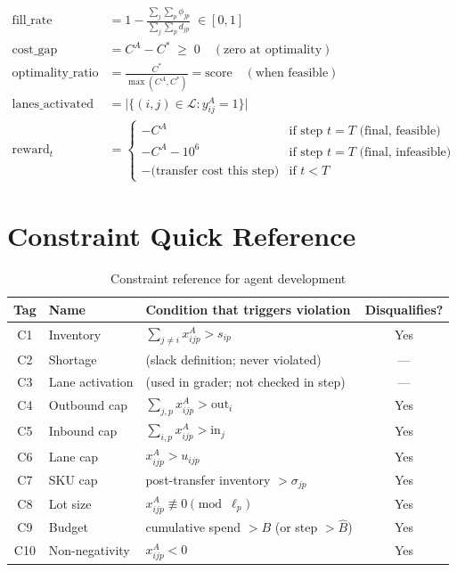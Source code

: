 \documentclass[11pt, a4paper]{article}
\begin{document}
\begin{align}
  \text{fill\_rate}
  &= 1 - \frac{\displaystyle\sum_{j}\sum_{p} \phi_{jp}}
              {\displaystyle\sum_{j}\sum_{p} d_{jp}}
  \;\in [0, 1] \\[6pt]
  \text{cost\_gap}
  &= C^A - C^* \;\geq\; 0
    \quad (\text{zero at optimality}) \\[6pt]
  \text{optimality\_ratio}
  &= \frac{C^*}{\max(C^A, C^*)}
    = \text{score}
    \quad (\text{when feasible}) \\[6pt]
  \text{lanes\_activated}
  &= \bigl|\{(i,j) \in \mathcal{L} : y_{ij}^A = 1\}\bigr| \\[6pt]
  \text{reward}_t
  &=
  \begin{cases}
    -C^A & \text{if step $t = T$ (final, feasible)} \\
    -C^A - 10^6 & \text{if step $t = T$ (final, infeasible)} \\
    -\text{(transfer cost this step)} & \text{if } t < T
  \end{cases}
\end{align}

\appendix
\section{Constraint Quick Reference}

\begin{table}[h!]
\centering
\renewcommand{\arraystretch}{1.4}
\begin{tabular}{@{}clp{7cm}c@{}}
\toprule
\textbf{Tag} & \textbf{Name} & \textbf{Condition that triggers violation}
  & \textbf{Disqualifies?} \\
\midrule
C1  & Inventory      & $\sum_{j\neq i} x_{ijp}^A > s_{ip}$   & Yes \\
C2  & Shortage       & (slack definition; never violated)     & --- \\
C3  & Lane activation & (used in grader; not checked in step) & --- \\
C4  & Outbound cap   & $\sum_{j,p} x_{ijp}^A > \text{out}_i$ & Yes \\
C5  & Inbound cap    & $\sum_{i,p} x_{ijp}^A > \text{in}_j$  & Yes \\
C6  & Lane cap       & $x_{ijp}^A > u_{ijp}$                 & Yes \\
C7  & SKU cap        & post-transfer inventory $> \sigma_{jp}$& Yes \\
C8  & Lot size       & $x_{ijp}^A \not\equiv 0\pmod{\ell_p}$ & Yes \\
C9  & Budget         & cumulative spend $> B$ (or step $> \hat{B}$) & Yes \\
C10 & Non-negativity & $x_{ijp}^A < 0$                       & Yes \\
\bottomrule
\end{tabular}
\caption{Constraint reference for agent development}
\end{table}
\end{document}
